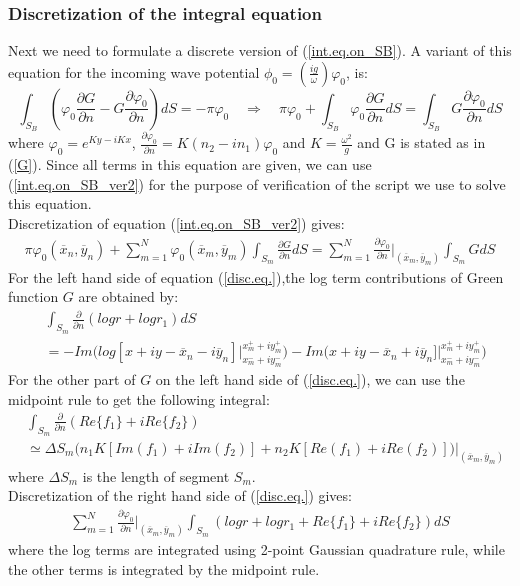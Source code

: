 \documentclass[a4paper,10pt]{article}
\newcommand{\dd}{\partial}
\newcommand{\xbar}{\overline{x}}
\newcommand{\ybar}{\overline{y}}
\begin{document}
\subsubsection{Discretization of the integral equation}
Next we need to formulate a discrete version of (\ref{int.eq.on_SB}). A variant of this equation for the incoming wave potential $\phi_0 = (\frac{ig}{\omega})\varphi_0$, is:
\begin{equation}\label{int.eq.on_SB_ver2}
	\int_{S_B}(\varphi_0 \frac{\dd G}{\dd n} - G \frac{\dd \varphi_0}{\dd n})dS = -\pi \varphi_0 \quad \Rightarrow \quad 
	\pi \varphi_0 + \int_{S_B} \varphi_0 \frac{\dd G}{\dd n} dS = \int_{S_B} G \frac{\dd \varphi_0}{\dd n} dS
\end{equation}
where $\varphi_0 = e^{K y - i K x}$, $\frac{\dd \varphi_0}{\dd n} = K(n_2 - i n_1)\varphi_0$ and $K = \frac{\omega^2}{g}$ and G is stated as in (\ref{G}). Since all terms in this equation are given, we can use (\ref{int.eq.on_SB_ver2}) for the purpose of verification of the script we use to solve this equation.\\[1 em]
Discretization of equation (\ref{int.eq.on_SB_ver2}) gives:
\begin{align} \label{disc.eq.}
\pi \varphi_0(\xbar_n, \ybar_n) + \sum_{m=1}^N \varphi_0(\xbar_m, \ybar_m) \int_{S_m} \frac{\dd G}{\dd n}dS = \sum_{m=1}^N \frac{\dd \varphi_0}{\dd n} \bigg\vert_{(\xbar_m, \ybar_m)} \int_{S_m} G dS
\end{align}
For the left hand side of equation (\ref{disc.eq.}),the log term contributions of Green function $G$ are obtained by:
\begin{align} \label{LHS-log}
& \int_{S_m}\frac{\dd}{\dd n}(log r + log r_1)dS \nonumber \\
& = -Im\bigg(log[x + iy - \xbar_n - i\ybar_n]\bigg\vert_{x_m^- + i y_m^-}^{x_m^+ + i y_m^+}\bigg)-Im\bigg(x + iy - \xbar_n + i\ybar_n]\bigg\vert_{x_m^- + i y_m^-}^{x_m^+ + i y_m^+}\bigg)
\end{align}
For the other part of $G$ on the left hand side of (\ref{disc.eq.}), we can use the midpoint rule to get the following integral:
\begin{align} \label{LHS-wp}
& \int_{S_m} \frac{\dd}{\dd n}(Re \{ f_1 \} + i Re \{ f_2 \}) \nonumber \\
& \simeq \Delta S_m \bigg( n_1 K [Im(f_1) + i Im(f_2)] + n_2 K [Re(f_1) + i Re(f_2)] \bigg) \bigg\vert_{(\xbar_m, \ybar_m)}
\end{align}
where $\Delta S_m$ is the length of segment $S_m$.\\[1 em]
Discretization of the right hand side of (\ref{disc.eq.}) gives:
\begin{align} \label{RHS}
\sum_{m=1}^N \frac{\dd \varphi_0}{\dd n} \bigg\vert_{(\xbar_m, \ybar_m)} \int_{S_m} (log r + log r_1 + Re \{ f_1 \} + i Re \{ f_2 \} ) dS
\end{align}
where the log terms are integrated using 2-point Gaussian quadrature rule, while the other terms is integrated by the midpoint rule.\\[1 em]
\end{document}
